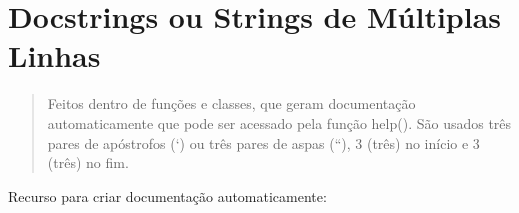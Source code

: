 \documentclass[letterpaper,10pt,brazil]{sphinxmanual}
\begin{document}
\begin{sphinxVerbatim}[commandchars=\\\{\}]


    

  
\end{sphinxVerbatim}


\section{Docstrings ou Strings de Múltiplas Linhas}
\label{\detokenize{content/language_particularities:docstrings-ou-strings-de-multiplas-linhas}}\begin{quote}

Feitos dentro de funções e classes, que geram documentação automaticamente que pode ser acessado pela função help().
São usados três pares de apóstrofos (‘) ou três pares de aspas (“), 3 (três) no início e 3 (três) no fim.
\end{quote}

\begin{sphinxVerbatim}[commandchars=\\\{\}]



\end{sphinxVerbatim}

Recurso para criar documentação automaticamente:

\begin{sphinxVerbatim}[commandchars=\\\{\}]
 

\end{sphinxVerbatim}

\begin{sphinxVerbatim}[commandchars=\\\{\}]

\end{sphinxVerbatim}
\end{document}
